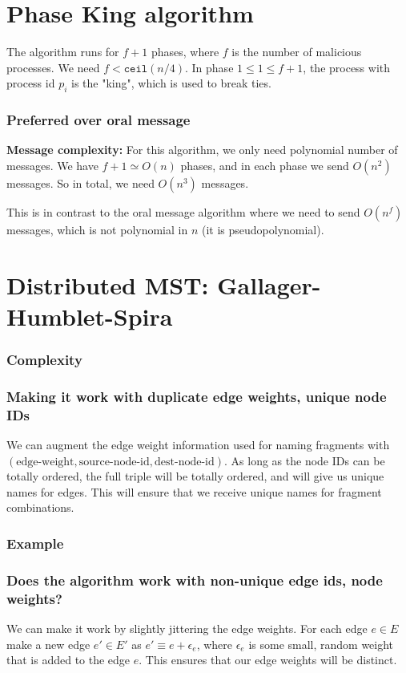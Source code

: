 \documentclass{article}
\begin{document}
\section{Phase King algorithm}

The algorithm runs for $f+1$ phases, where $f$ is the number of malicious processes.
We need $f < \texttt{ceil}(n/4)$. In phase $1 \leq 1 \leq f + 1$, the process
with process id $p_i$ is the "king", which is used to break ties. 

\subsubsection{Preferred over oral message}

\textbf{Message complexity:}
For this algorithm, we only need polynomial number of messages. We have
$f+1 \simeq O(n)$ phases, and in each phase we send $O(n^2)$ messages. So in total, 
we need $O(n^3)$ messages. 

This is in contrast to the oral message algorithm where we need to
send $O(n^f)$ messages, which is not polynomial in $n$ (it is pseudopolynomial).




\section{Distributed MST: Gallager-Humblet-Spira}
\subsubsection{Complexity}


\subsubsection{Making it work with duplicate edge weights, unique node IDs}
We can augment the edge weight information used for naming fragments
with $(\text{edge-weight}, \text{source-node-id}, \text{dest-node-id})$. As
long as the node IDs can be totally ordered, the full triple will be
totally ordered, and will give us unique names for edges. This will ensure
that we receive unique names for fragment combinations.

\subsubsection{Example}

\subsubsection{Does the algorithm work with non-unique edge ids, node weights?}
We can make it work by slightly jittering the edge weights. For each edge $e \in E$
make a new edge $e' \in E'$ as $e' \equiv e + \epsilon_e$, where $\epsilon_e$ 
is some small, random weight that is added to the edge $e$. This ensures that
our edge weights will be distinct. 
\end{document}
